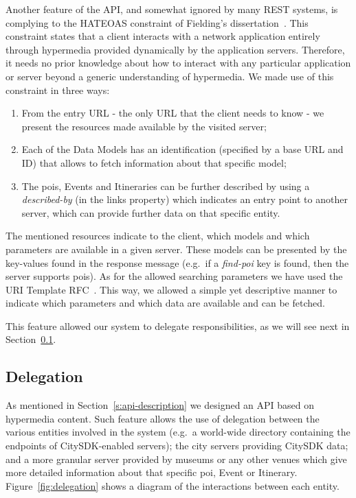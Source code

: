\documentclass[times,doublespace]{ettauth}%
\begin{document}
Another feature of the API, and somewhat ignored by many REST systems, is complying to the \acf{HATEOAS} constraint of Fielding's dissertation~\cite{fielding_phd}.
This constraint states that a client interacts with a network application entirely through hypermedia provided dynamically by the application servers. Therefore, it needs no prior knowledge about how to interact with any particular application or server beyond a generic understanding of hypermedia. We made use of this constraint in three ways:
\begin{enumerate}
\item From the entry URL - the only URL that the client needs to know - we present the resources made available by the visited server;
\item Each of the Data Models has an identification (specified by a base URL and ID) that allows to fetch information about that specific model;
\item The \acp{poi}, Events and Itineraries can be further described by using a \textit{described-by} (in the links property) which indicates an entry point to another server, which can provide further data on that specific entity.
\end{enumerate}

The mentioned resources indicate to the client, which models and which parameters are available in a given server. These models can be presented by the key-values found in the response message (e.g.\  if a \textit{find-poi} key is found, then the server supports \acp{poi}). As for the allowed searching parameters we have used the URI Template RFC~\cite{uri-template}. This way, we allowed a simple yet descriptive manner to indicate which parameters and which data are available and can be fetched.

This feature allowed our system to delegate responsibilities, as we will see next in Section~\ref{delegation}.

\subsection{Delegation}
\label{delegation}
As mentioned in Section~\ref{s:api-description} we designed an API based on hypermedia content. Such feature allows the use of delegation between the various entities involved in the system (e.g.\ a world-wide directory containing the endpoints of CitySDK-enabled servers); the city servers providing CitySDK data; and a more granular server provided by museums or any other venues which give more detailed information about that specific \ac{poi}, Event or Itinerary. Figure~\ref{fig:delegation} shows a diagram of the interactions between each entity.
\end{document}
